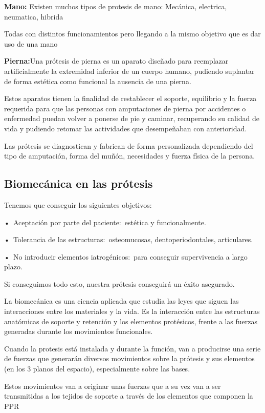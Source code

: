 \documentclass{article}
\begin{document}
\textbf{Mano:} Existen muchos tipos de protesis de mano:
   Mecánica, electrica, neumatica, hibrida

   Todas con distintos funcionamientos pero llegando a la mismo objetivo que es dar uso de una mano

\textbf{Pierna:}Una prótesis de pierna es un aparato diseñado para reemplazar artificialmente la extremidad inferior de un cuerpo humano, pudiendo suplantar de forma estética como funcional la ausencia de una pierna.

Estos aparatos tienen la finalidad de restablecer el soporte, equilibrio y la fuerza requerida para que las personas con amputaciones de pierna por accidentes o enfermedad puedan volver a ponerse de pie y caminar, recuperando su calidad de vida y pudiendo retomar las actividades que desempeñaban con anterioridad.

Las prótesis se diagnostican y fabrican de forma personalizada dependiendo del tipo de amputación, forma del muñón, necesidades y fuerza física de la persona.

\subsection{Biomecánica en las prótesis}
Tenemos que conseguir los siguientes objetivos:

• Aceptación por parte del paciente: estética y funcionalmente.

• Tolerancia de las estructuras: osteomucosas, dentoperiodontales, articulares.

• No introducir elementos iatrogénicos: para conseguir supervivencia a largo plazo.

Si conseguimos todo esto, nuestra prótesis conseguirá un éxito asegurado.

La biomecánica es una ciencia aplicada que estudia las leyes que siguen las interacciones entre los materiales y la vida. Es la interacción entre las estructuras anatómicas de soporte y retención y los elementos protésicos, frente a las fuerzas generadas durante los movimientos funcionales.

Cuando la protesis está instalada y durante la función, van a producirse una serie de fuerzas que generarán diversos movimientos sobre la prótesis y sus elementos (en los 3 planos del espacio), especialmente sobre las bases.

Estos movimientos van a originar unas fuerzas que a su vez van a ser transmitidas a los tejidos de soporte a través de los elementos que componen la PPR
\end{document}
